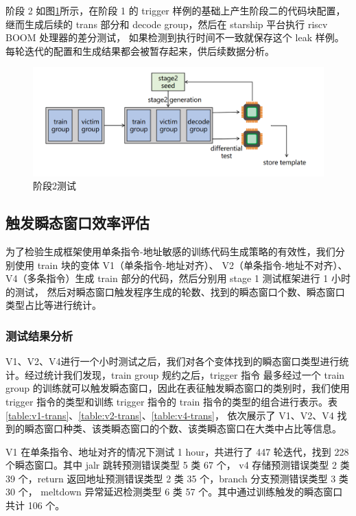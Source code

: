 阶段 2 如图\ref{paper:stage2-test}所示，在阶段 1 的 trigger 样例的基础上产生阶段二的代码块配置，
继而生成后续的 trans 部分和 decode group，然后在 starship 平台执行 riscv BOOM 处理器的差分测试，
如果检测到执行时间不一致就保存这个 leak 样例。
每轮迭代的配置和生成结果都会被暂存起来，供后续数据分析。\par

\begin{figure}[!h]
    \centering
    \includegraphics[width=\linewidth]{figure/paper/stage2-test.png}
    \caption{阶段2测试}
    \label{paper:stage2-test}
\end{figure}

\subsection{触发瞬态窗口效率评估}

为了检验生成框架使用单条指令-地址敏感的训练代码生成策略的有效性，我们分别使用 train 块的变体 V1（单条指令-地址对齐）、
V2（单条指令-地址不对齐）、V4（多条指令）生成 train 部分的代码，然后分别用 stage 1 测试框架进行 1 小时的测试，
然后对瞬态窗口触发程序生成的轮数、找到的瞬态窗口个数、瞬态窗口类型占比等进行统计。\par

\subsubsection{测试结果分析}

V1、V2、V4进行一个小时测试之后，我们对各个变体找到的瞬态窗口类型进行统计。经过统计我们发现，train group 规约之后，trigger 指令
最多经过一个 train group 的训练就可以触发瞬态窗口，因此在表征触发瞬态窗口的类别时，我们使用 trigger 指令的类型和训练 trigger 指令的
train 指令的类型的组合进行表示。表\ref{table:v1-trans}、\ref{table:v2-trans}、\ref{table:v4-trans}，
依次展示了 V1、V2、V4 找到的瞬态窗口种类、该类瞬态窗口的个数、该类瞬态窗口在大类中占比等信息。\par

V1 在单条指令、地址对齐的情况下测试 1 hour，共进行了 447 轮迭代，找到 228 个瞬态窗口。其中 jalr 跳转预测错误类型 5 类 67 个，
v4 存储预测错误类型 2 类 39 个，return 返回地址预测错误类型 2 类 35 个，branch 分支预测错误类型 3 类 30 个，
meltdown 异常延迟检测类型 6 类 57 个。其中通过训练触发的瞬态窗口共计 106 个。\par

